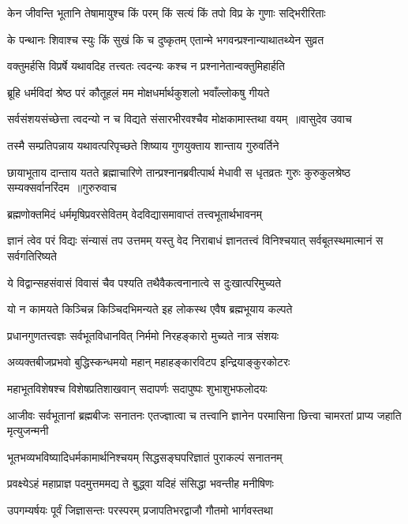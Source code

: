 \twolineshloka
{केन जीवन्ति भूतानि तेषामायुश्च किं परम्}
{किं सत्यं किं तपो विप्र के गुणाः सद्भिरीरिताः}


\twolineshloka
{के पन्थानः शिवाश्च स्युः किं सुखं कि च दुष्कृतम्}
{एतान्मे भगवन्प्रश्नान्याथातथ्येन सुव्रत}


\twolineshloka
{वक्तुमर्हसि विप्रर्षे यथावदिह तत्त्वतः}
{त्वदन्यः कश्च न प्रश्नानेतान्वक्तुमिहार्हति}


\twolineshloka
{ब्रूहि धर्मविदां श्रेष्ठ परं कौतूहलं मम}
{मोक्षधर्मार्थकुशलो भवाँल्लोकषु गीयते}


\threelineshloka
{सर्वसंशयसंच्छेत्ता त्वदन्यो न च विद्यते}
{संसारभीरवश्चैव मोक्षकामास्तथा वयम् ॥वासुदेव उवाच}
{}


\twolineshloka
{तस्मै सम्प्रतिपन्नाय यथावत्परिपृच्छते}
{शिष्याय गुणयुक्ताय शान्ताय गुरुवर्तिने}


\fourlineindentedshloka
{छायाभूताय दान्ताय यतते ब्रह्माचारिणे}
{तान्प्रश्नानब्रवीत्पार्थ मेधावी स धृतव्रतः}
{गुरुः कुरुकुलश्रेष्ठ सम्यक्सर्वानरिंदम ॥गुरुरुवाच}
{}


\twolineshloka
{ब्रह्मणोक्तमिदं धर्ममृषिप्रवरसेवितम्}
{वेदविद्यासमावाप्तं तत्त्वभूतार्थभावनम्}


\threelineshloka
{ज्ञानं त्वेव परं विद्यः संन्यासं तप उत्तमम्}
{यस्तु वेद निराबाधं ज्ञानतत्त्वं विनिश्चयात्}
{सर्वबूतस्थमात्मानं स सर्वगतिरिष्यते}


\twolineshloka
{ये विद्वान्सहसंवासं विवासं चैव पश्यति}
{तथैवैकत्वनानात्वे स दुःखात्परिमुच्यते}


\twolineshloka
{यो न कामयते किञ्चिन्न किञ्चिदभिमन्यते}
{इह लोकस्थ एवैष ब्रह्मभूयाय कल्पते}


\twolineshloka
{प्रधानगुणतत्त्वज्ञः सर्वभूतविधानवित्}
{निर्ममो निरहङ्कारो मुच्यते नात्र संशयः}


\twolineshloka
{अव्यक्तबीजप्रभवो बुद्धिस्कन्धमयो महान्}
{महाहङ्कारविटप इन्द्रियाङ्कुरकोटरः}


\twolineshloka
{महाभूतविशेषश्च विशेषप्रतिशाखवान्}
{सदापर्णः सदापुष्पः शुभाशुभफलोदयः}


\threelineshloka
{आजीवः सर्वभूतानां ब्रह्मबीजः सनातनः}
{एतज्ज्ञात्वा च तत्त्वानि ज्ञानेन परमासिना}
{छित्त्वा चामरतां प्राप्य जहाति मृत्युजन्मनी}


\twolineshloka
{भूतभव्यभविष्यादिधर्मकामार्थनिश्चयम्}
{सिद्धसङ्घपरिज्ञातं पुराकल्पं सनातनम्}


\twolineshloka
{प्रवक्ष्येऽहं महाप्राज्ञ पदमुत्तममद्य ते}
{बुद्ध्वा यदिहं संसिद्धा भवन्तीह मनीषिणः}


\twolineshloka
{उपगम्यर्षयः पूर्वं जिज्ञासन्तः परस्परम्}
{प्रजापतिभरद्वाजौ गौतमो भार्गवस्तथा}


